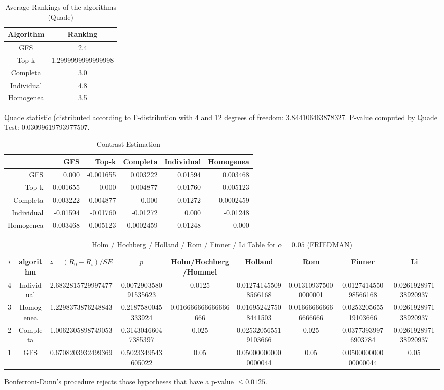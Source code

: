 \documentclass[a4paper,10pt]{article}
\begin{document}
\begin{landscape}
\newpage

\begin{table}[!htp]
\centering
\caption{Average Rankings of the algorithms (Quade)
}\begin{tabular}{c|c}
Algorithm&Ranking\\
\hline
GFS&2.4\\
Top-k&1.2999999999999998\\
Completa&3.0\\
Individual&4.8\\
Homogenea&3.5\\
\end{tabular}
\end{table}
Quade statistic (distributed according to F-distribution with 4 and 12 degrees of freedom: 3.844106463878327. 
P-value computed by Quade Test: 0.03099619793977507.\newline


\newpage

\begin{table}[!htp]
\centering\tiny
\caption{Contrast Estimation}
\begin{tabular}{
|r|r|r|r|r|r|}
\hline
 &GFS&Top-k&Completa&Individual&Homogenea\\
\hline
GFS&0.000&-0.001655&0.003222&0.01594&0.003468\\
\hline
Top-k&0.001655&0.000&0.004877&0.01760&0.005123\\
\hline
Completa&-0.003222&-0.004877&0.000&0.01272&0.0002459\\
\hline
Individual&-0.01594&-0.01760&-0.01272&0.000&-0.01248\\
\hline
Homogenea&-0.003468&-0.005123&-0.0002459&0.01248&0.000\\
\hline

\end{tabular}
\end{table}

\newpage

\begin{table}[!htp]
\centering\scriptsize
\caption{Holm / Hochberg / Holland / Rom / Finner / Li Table for $\alpha=0.05$ (FRIEDMAN)}
\begin{tabular}{ccccccccc}
$i$&algorithm&$z=(R_0 - R_i)/SE$&$p$&Holm/Hochberg/Hommel&Holland&Rom&Finner&Li\\
\hline
4&Individual&2.6832815729997477&0.007290358091535623&0.0125&0.012741455098566168&0.013109375000000001&0.012741455098566168&0.026192897138920937\\
3&Homogenea&1.2298373876248843&0.2187580045333924&0.016666666666666666&0.016952427508441503&0.016666666666666666&0.025320565519103666&0.026192897138920937\\
2&Completa&1.0062305898749053&0.31430466047385397&0.025&0.025320565519103666&0.025&0.03773939976903784&0.026192897138920937\\
1&GFS&0.6708203932499369&0.5023349543605022&0.05&0.050000000000000044&0.05&0.050000000000000044&0.05\\
\hline
\end{tabular}
\end{table}
Bonferroni-Dunn's procedure rejects those hypotheses that have a p-value $\le0.0125$.



\end{landscape}
\end{document}
